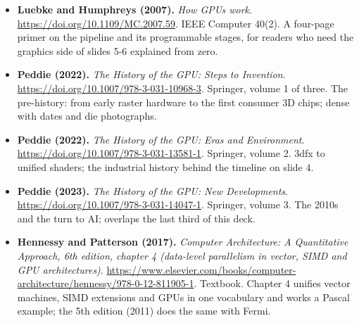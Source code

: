 \documentclass[11pt,letterpaper]{article}
\begin{document}
\begin{itemize}[leftmargin=1.2em,itemsep=3pt]
\item \textbf{Luebke and Humphreys (2007).} \textit{How GPUs work}. \url{https://doi.org/10.1109/MC.2007.59}. IEEE Computer 40(2). A four-page primer on the pipeline and its programmable stages, for readers who need the graphics side of slides 5-6 explained from zero.
\item \textbf{Peddie (2022).} \textit{The History of the GPU: Steps to Invention}. \url{https://doi.org/10.1007/978-3-031-10968-3}. Springer, volume 1 of three. The pre-history: from early raster hardware to the first consumer 3D chips; dense with dates and die photographs.
\item \textbf{Peddie (2022).} \textit{The History of the GPU: Eras and Environment}. \url{https://doi.org/10.1007/978-3-031-13581-1}. Springer, volume 2. 3dfx to unified shaders; the industrial history behind the timeline on slide 4.
\item \textbf{Peddie (2023).} \textit{The History of the GPU: New Developments}. \url{https://doi.org/10.1007/978-3-031-14047-1}. Springer, volume 3. The 2010s and the turn to AI; overlaps the last third of this deck.
\item \textbf{Hennessy and Patterson (2017).} \textit{Computer Architecture: A Quantitative Approach, 6th edition, chapter 4 (data-level parallelism in vector, SIMD and GPU architectures)}. \url{https://www.elsevier.com/books/computer-architecture/hennessy/978-0-12-811905-1}. Textbook. Chapter 4 unifies vector machines, SIMD extensions and GPUs in one vocabulary and works a Pascal example; the 5th edition (2011) does the same with Fermi.
\end{itemize}
\end{document}

